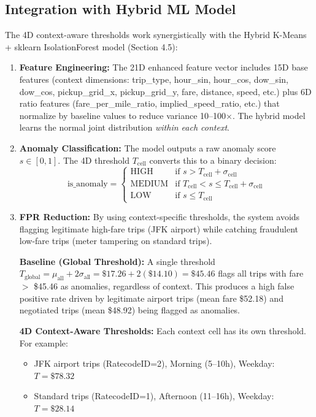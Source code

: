\subsection{Integration with Hybrid ML Model}

The 4D context-aware thresholds work synergistically with the Hybrid K-Means + sklearn IsolationForest model (Section 4.5):

\begin{enumerate}
    \item \textbf{Feature Engineering:} The 21D enhanced feature vector includes 15D base features (context dimensions: trip\_type, hour\_sin, hour\_cos, dow\_sin, dow\_cos, pickup\_grid\_x, pickup\_grid\_y, fare, distance, speed, etc.) plus 6D ratio features (fare\_per\_mile\_ratio, implied\_speed\_ratio, etc.) that normalize by baseline values to reduce variance 10--100$\times$. The hybrid model learns the normal joint distribution \emph{within each context}.

    \item \textbf{Anomaly Classification:} The model outputs a raw anomaly score $s \in [0, 1]$. The 4D threshold $T_{\text{cell}}$ converts this to a binary decision:
        \begin{equation}
        \text{is\_anomaly} = \begin{cases}
        \text{HIGH} & \text{if } s > T_{\text{cell}} + \sigma_{\text{cell}} \\
        \text{MEDIUM} & \text{if } T_{\text{cell}} < s \leq T_{\text{cell}} + \sigma_{\text{cell}} \\
        \text{LOW} & \text{if } s \leq T_{\text{cell}}
        \end{cases}
        \end{equation}

    \item \textbf{FPR Reduction:} By using context-specific thresholds, the system avoids flagging legitimate high-fare trips (JFK airport) while catching fraudulent low-fare trips (meter tampering on standard trips).

        \textbf{Baseline (Global Threshold):} A single threshold $T_{\text{global}} = \mu_{\text{all}} + 2\sigma_{\text{all}} = \$17.26 + 2(\$14.10) = \$45.46$ flags all trips with fare $>$ \$45.46 as anomalies, regardless of context. This produces a high false positive rate driven by legitimate airport trips (mean fare \$52.18) and negotiated trips (mean \$48.92) being flagged as anomalies.

        \textbf{4D Context-Aware Thresholds:} Each context cell has its own threshold. For example:
        \begin{itemize}
            \item JFK airport trips (RatecodeID=2), Morning (5--10h), Weekday: $T = \$78.32$
            \item Standard trips (RatecodeID=1), Afternoon (11--16h), Weekday: $T = \$28.14$
        \end{itemize}


\end{enumerate}
